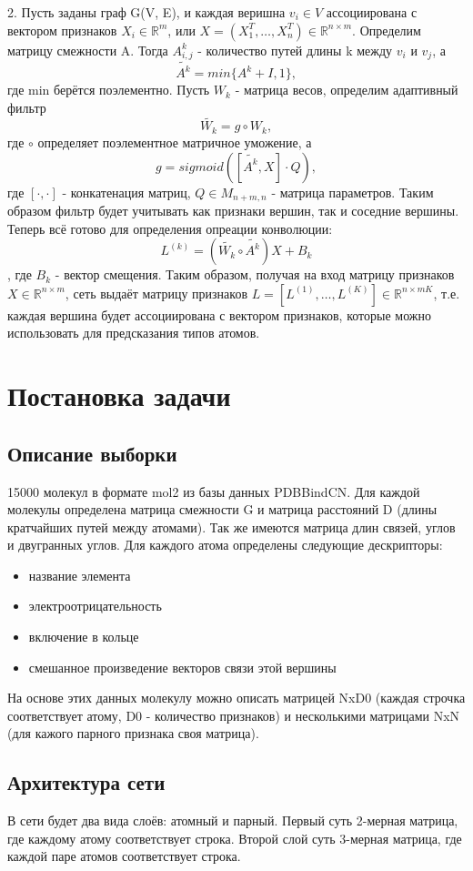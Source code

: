 \documentclass[12pt,twoside]{article}
\begin{document}
2. Пусть заданы граф G(V, E), и каждая веришна $v_i \in V$ ассоциирована с вектором признаков $X_i \in \mathbb{R}^m$, или $X=(X_1^T,\dots,X_n^T) \in \mathbb{R}^{n \times m}$. Определим матрицу смежности A. Тогда $A^k_{i,j}$ - количество путей длины k между $v_i$ и $v_j$, а $$\widetilde{A^k}=min\{A^k + I, 1\},$$ где min берётся поэлементно. Пусть $W_k$ - матрица весов, определим адаптивный фильтр $$\widetilde{W_k}=g \circ W_k,$$ где $\circ$ определяет поэлементное матричное уможение, а $$g = sigmoid([\widetilde{A^k}, X] \cdot Q),$$ где $[\cdot, \cdot]$ - конкатенация матриц, $Q \in M_{n+m, n}$ - матрица параметров. Таким образом фильтр будет учитывать как признаки вершин, так и соседние вершины. Теперь всё готово для определения опреации конволюции: $$L^{(k)} = (\widetilde{W_k} \circ \widetilde{A^k}) X + B_k$$, где $B_k$ - вектор смещения. Таким образом, получая на вход матрицу признаков $X\in \mathbb{R}^{n \times m}$, сеть выдаёт матрицу признаков $L = [L^{(1)},\dots,L^{(K)}] \in \mathbb{R}^{n \times mK}$, т.е. каждая вершина будет ассоциирована с вектором признаков, которые можно использовать для предсказания типов атомов.\cite{article20}

\section{Постановка задачи}
\subsection{Описание выборки}
15000 молекул в формате mol2 из базы данных PDBBindCN. Для каждой молекулы определена матрица смежности G и матрица расстояний D (длины кратчайших путей между атомами). Так же имеются матрица длин связей, углов и двугранных углов. Для каждого атома определены следующие дескрипторы:
\begin{itemize}
\item название элемента
\item электроотрицательность
\item включение в кольце
\item смешанное произведение векторов связи этой вершины
\end{itemize}

На основе этих данных молекулу можно описать матрицей NxD0 (каждая строчка соответствует атому, D0 - количество признаков) и несколькими матрицами NxN (для кажого парного признака своя матрица).

\subsection{Архитектура сети}
	В сети будет два вида слоёв: атомный и парный. Первый суть 2-мерная матрица, где каждому атому соответствует строка. Второй слой суть 3-мерная матрица, где каждой паре атомов соответствует строка.
	
\end{document}
